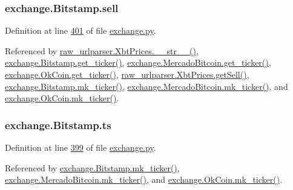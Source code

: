 \subsubsection[{\texorpdfstring{sell}{sell}}]{\setlength{\rightskip}{0pt plus 5cm}exchange.\+Bitstamp.\+sell}\hypertarget{classexchange_1_1_bitstamp_ae5bc1532848b36cd9ac5e46763f4ee14}{}\label{classexchange_1_1_bitstamp_ae5bc1532848b36cd9ac5e46763f4ee14}


Definition at line \hyperlink{exchange_8py_source_l00401}{401} of file \hyperlink{exchange_8py_source}{exchange.\+py}.



Referenced by \hyperlink{raw__urlparser_8py_source_l00074}{raw\+\_\+urlparser.\+Xbt\+Prices.\+\_\+\+\_\+str\+\_\+\+\_\+()}, \hyperlink{exchange_8py_source_l00409}{exchange.\+Bitstamp.\+get\+\_\+ticker()}, \hyperlink{exchange_8py_source_l00543}{exchange.\+Mercado\+Bitcoin.\+get\+\_\+ticker()}, \hyperlink{exchange_8py_source_l00608}{exchange.\+Ok\+Coin.\+get\+\_\+ticker()}, \hyperlink{raw__urlparser_8py_source_l00065}{raw\+\_\+urlparser.\+Xbt\+Prices.\+get\+Sell()}, \hyperlink{exchange_8py_source_l00423}{exchange.\+Bitstamp.\+mk\+\_\+ticker()}, \hyperlink{exchange_8py_source_l00557}{exchange.\+Mercado\+Bitcoin.\+mk\+\_\+ticker()}, and \hyperlink{exchange_8py_source_l00622}{exchange.\+Ok\+Coin.\+mk\+\_\+ticker()}.

\subsubsection[{\texorpdfstring{ts}{ts}}]{\setlength{\rightskip}{0pt plus 5cm}exchange.\+Bitstamp.\+ts}\hypertarget{classexchange_1_1_bitstamp_a8e85011dca7c70ffd1ed5ed398b0ed34}{}\label{classexchange_1_1_bitstamp_a8e85011dca7c70ffd1ed5ed398b0ed34}


Definition at line \hyperlink{exchange_8py_source_l00399}{399} of file \hyperlink{exchange_8py_source}{exchange.\+py}.



Referenced by \hyperlink{exchange_8py_source_l00423}{exchange.\+Bitstamp.\+mk\+\_\+ticker()}, \hyperlink{exchange_8py_source_l00557}{exchange.\+Mercado\+Bitcoin.\+mk\+\_\+ticker()}, and \hyperlink{exchange_8py_source_l00622}{exchange.\+Ok\+Coin.\+mk\+\_\+ticker()}.

